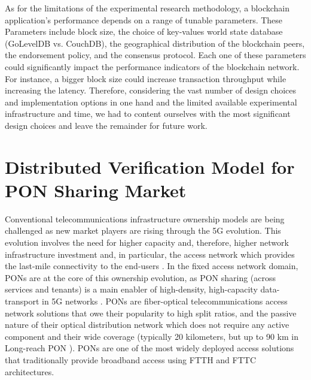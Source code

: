 As for the limitations of the experimental research methodology, a blockchain application's performance depends on a range of tunable parameters. These Parameters include block size, the choice of key-values world state database (GoLevelDB vs. CouchDB), the geographical distribution of the blockchain peers, the endorsement policy, and the consensus protocol. Each one of these parameters could significantly impact the performance indicators of the blockchain network. For instance, a bigger block size could increase transaction throughput while increasing the latency. Therefore, considering the vast number of design choices and implementation options in one hand and the limited available experimental infrastructure and time, we had to content ourselves with the most significant design choices and leave the remainder for future work.







\section{Distributed Verification Model for \ac{PON} Sharing Market}
\label{BC:sec:pon}

Conventional telecommunications infrastructure ownership models are being challenged as new market players are rising through the \ac{5G} evolution. This evolution involves the need for higher capacity and, therefore, higher network infrastructure investment and, in particular, the access network which provides the last-mile connectivity to the end-users \cite{Nima-5g-evol}.
In the fixed access network domain, \acp{PON} are at the core of this ownership evolution, as \ac{PON} sharing (across services and tenants) is a main enabler of high-density, high-capacity data-transport in \ac{5G} networks \cite{8412589}. \acp{PON} are fiber-optical telecommunications access network solutions that owe their popularity to high split ratios, and the passive nature of their optical distribution network which does not require any active component and their wide coverage (typically 20 kilometers, but up to 90 km in Long-reach \ac{PON} \cite{7592399}). \acp{PON} are one of the most widely deployed access solutions that traditionally provide broadband access using \ac{FTTH} and \ac{FTTC} architectures. 

